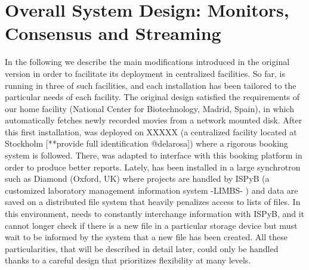 \section{Overall System Design: Monitors, Consensus and Streaming}
\label{overall}

In the following we describe the main modifications introduced in the original \scipion version in order to facilitate its deployment in centralized facilities. So far, \scipion is running in three of such facilities, and each installation has been tailored to the particular needs of each facility. The original design satisfied the requirements of our home facility (National Center for Biotechnology, Madrid, Spain), in which \scipion automatically fetches newly recorded movies from a network mounted disk. After this first installation, \scipion was deployed on XXXXX (a centralized facility located at Stockholm [**provide full identification @delarosa]) where a rigorous booking system is followed. There, \scipion was adapted to interface with this booking platform in order to produce better reports. Lately,  \scipion has been installed in a large synchrotron  such as Diamond (Oxford, UK) where projects are handled by ISPyB (a customized laboratory management information system -LIMBS- \citep{Delageniere2011}) and data are saved on a distributed file system that heavily penalizes access to lists of files. In this environment, \scipion needs to constantly interchange information with ISPyB, and it cannot longer check if there is a new file in a particular storage device but must wait to be informed by the system that a new file has been created. All these particularities, that will be described in detail later, could only be handled thanks to a careful design that prioritizes flexibility at many levels. 



